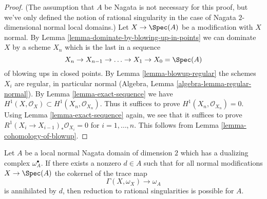 \begin{proof}
(The assumption that $A$ be Nagata is not necessary for this proof,
but we've only defined the notion of rational singularity in the
case of Nagata $2$-dimensional normal local domains.)
Let $X \to \Spec(A)$ be a modification with $X$ normal. By
Lemma \ref{lemma-dominate-by-blowing-up-in-points}
we can dominate $X$ by a scheme $X_n$ which is the last in a sequence
$$
X_n \to X_{n - 1} \to \ldots \to X_1 \to X_0 = \Spec(A)
$$
of blowing ups in closed points. By Lemma \ref{lemma-blowup-regular}
the schemes $X_i$ are regular, in particular
normal (Algebra, Lemma \ref{algebra-lemma-regular-normal}).
By Lemma \ref{lemma-exact-sequence} we have
$H^1(X, \mathcal{O}_X) \subset H^1(X_n, \mathcal{O}_{X_n})$.
Thus it suffices to prove $H^1(X_n, \mathcal{O}_{X_n}) = 0$.
Using Lemma \ref{lemma-exact-sequence} again, we
see that it suffices to prove $R^1(X_i \to X_{i - 1})_*\mathcal{O}_{X_i} = 0$
for $i = 1, \ldots, n$. This follows from
Lemma \ref{lemma-cohomology-of-blowup}.
\end{proof}

\begin{lemma}
\label{lemma-bound-dualizing-implies-bound}
Let $A$ be a local normal Nagata domain of dimension $2$ which has a
dualizing complex $\omega_A^\bullet$. If there exists a nonzero $d \in A$
such that for all normal modifications $X \to \Spec(A)$ the cokernel of the
trace map
$$
\Gamma(X, \omega_X) \to \omega_A
$$
is annihilated by $d$, then reduction to rational singularities
is possible for $A$.
\end{lemma}

